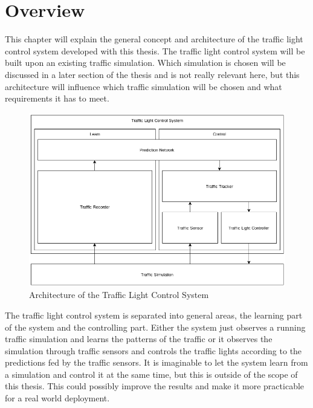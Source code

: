 \section{Overview}

This chapter will explain the general concept and architecture of the traffic light control system developed with this thesis. The traffic light control system will be built upon an existing traffic simulation. Which simulation is chosen will be discussed in a later section of the thesis and is not really relevant here, but this architecture will influence which traffic simulation will be chosen and what requirements it has to meet.

\begin{figure}[ht]
	\centering
  \includegraphics[width=16cm]{figures/architecture.png}
	\caption[Architecture of the Traffic Light Control System]{Architecture of the Traffic Light Control System \protect\footnotemark}
	\label{architecture}
\end{figure}


The traffic light control system is separated into general areas, the learning part of the system and the controlling part. Either the system just observes a running traffic simulation and learns the patterns of the traffic or it observes the simulation through traffic sensors and controls the traffic lights according to the predictions fed by the traffic sensors. It is imaginable to let the system learn from a simulation and control it at the same time, but this is outside of the scope of this thesis. This could possibly improve the results and make it more practicable for a real world deployment.

